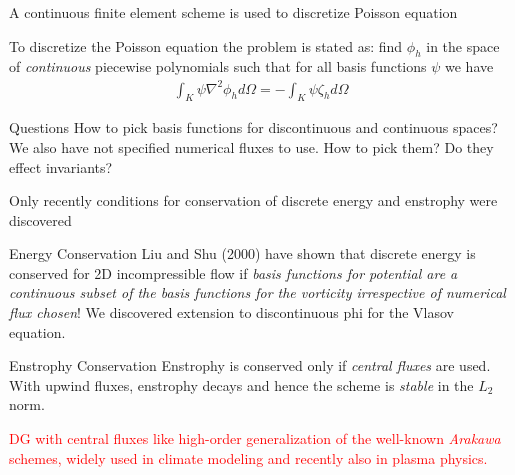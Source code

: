 \documentclass[pdf]{beamer}
\newcommand{\mypause}{}
\theoremstyle{definition}
\begin{document}
\begin{frame}{A continuous finite element scheme is used to discretize
    Poisson equation}

  To discretize the Poisson equation the problem is stated as: find
  $\phi_h$ in the space of \emph{continuous} piecewise polynomials
  such that for all basis functions $\psi$ we have
  \begin{align*}
    \int_K \psi \nabla^2 \phi_h d\Omega = -\int_K \psi \zeta_h d\Omega
  \end{align*}
  \mypause
  \begin{block}{Questions}
    How to pick basis functions for discontinuous and continuous
    spaces? We also have not specified numerical fluxes to use. How to
    pick them?  Do they effect invariants?
  \end{block}
\end{frame}

\begin{frame}{Only recently conditions for conservation of discrete
    energy and enstrophy were discovered}%
  \small
  \begin{block}{Energy Conservation}
    Liu and Shu (2000) have shown that discrete energy is conserved
    for 2D incompressible flow if \emph{basis functions for potential
      are a continuous subset of the basis functions for the vorticity
      irrespective of numerical flux chosen}! We discovered extension
    to discontinuous phi for the Vlasov equation.
  \end{block}

  \begin{block}{Enstrophy Conservation}
    Enstrophy is conserved only if \emph{central fluxes} are
    used. With upwind fluxes, enstrophy decays and hence the scheme is
    \emph{stable} in the $L_2$ norm.
  \end{block}

  \mypause \textcolor{red}{DG with central fluxes like high-order
    generalization of the well-known \emph{Arakawa} schemes, widely
    used in climate modeling and recently also in plasma physics.}

\end{frame}
\end{document}
